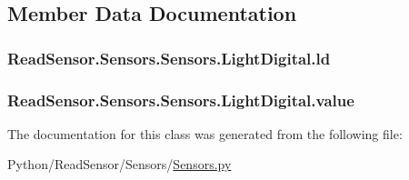 \subsection{Member Data Documentation}
\subsubsection[{\texorpdfstring{ld}{ld}}]{\setlength{\rightskip}{0pt plus 5cm}Read\+Sensor.\+Sensors.\+Sensors.\+Light\+Digital.\+ld}\hypertarget{classReadSensor_1_1Sensors_1_1Sensors_1_1LightDigital_a4611ccb175f8fa999881e4a8a988938e}{}\label{classReadSensor_1_1Sensors_1_1Sensors_1_1LightDigital_a4611ccb175f8fa999881e4a8a988938e}
\subsubsection[{\texorpdfstring{value}{value}}]{\setlength{\rightskip}{0pt plus 5cm}Read\+Sensor.\+Sensors.\+Sensors.\+Light\+Digital.\+value}\hypertarget{classReadSensor_1_1Sensors_1_1Sensors_1_1LightDigital_ab2b9606c4065e6eef00b79c9aabc5138}{}\label{classReadSensor_1_1Sensors_1_1Sensors_1_1LightDigital_ab2b9606c4065e6eef00b79c9aabc5138}


The documentation for this class was generated from the following file\+:\begin{DoxyCompactItemize}
\item 
Python/\+Read\+Sensor/\+Sensors/\hyperlink{Sensors_8py}{Sensors.\+py}\end{DoxyCompactItemize}
